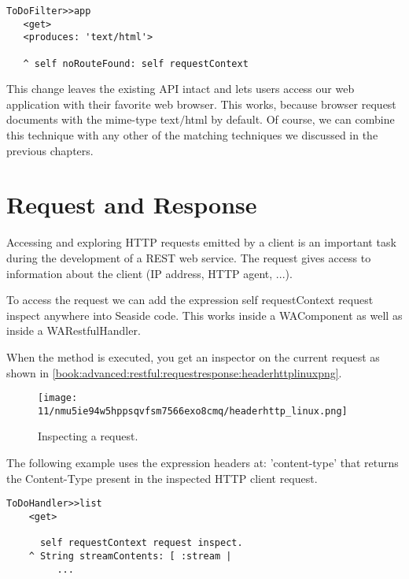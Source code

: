 \documentclass[a4paper,10pt,twoside]{book}
\newcommand{\ct}[1]{{\small\ttfamily\textup{#1}}}
\begin{document}
\begin{lstlisting}
ToDoFilter>>app
   <get>
   <produces: 'text/html'>

   ^ self noRouteFound: self requestContext
\end{lstlisting}

This change leaves the existing API intact and lets users access our web application with their favorite web browser. This works, because browser request documents with the mime-type \ct{text$/$html} by default. Of course, we can combine this technique with any other of the matching techniques we discussed in the previous chapters.

\section{Request and Response}
\label{book:advanced:restful:requestresponse}

 Accessing and exploring HTTP requests emitted by a client is an important task during the development of a REST web service. The request gives access to information about the client (IP address, HTTP agent, ...).

To access the request we can add the expression \ct{self requestContext request inspect} anywhere into Seaside code. This works inside a \ct{WAComponent} as well as inside a \ct{WARestfulHandler}.

When the method is executed, you get an inspector on the current request as shown in \autoref{book:advanced:restful:requestresponse:headerhttplinuxpng}.

\begin{figure}[h!tbp]
	\begin{center}
		\texttt{[image: 11/nmu5ie94w5hppsqvfsm7566exo8cmq/headerhttp\_linux.png]}
		\caption{Inspecting a request.\label{book:advanced:restful:requestresponse:headerhttplinuxpng}}
	\end{center}
\end{figure}


The following example uses the expression \ct{headers at: 'content-type'} that returns the \ct{Content-Type} present in the inspected HTTP client request. 

\begin{lstlisting}
ToDoHandler>>list
    <get>
	
      self requestContext request inspect.
	^ String streamContents: [ :stream |
         ...
\end{lstlisting}
\end{document}
